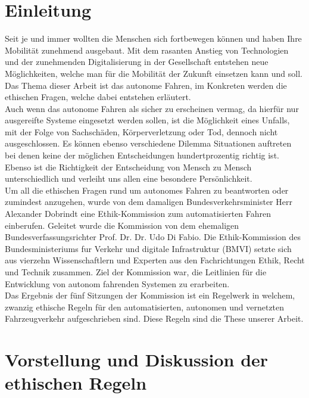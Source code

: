 \documentclass[twoside,a4paper,12pt]{article}
\begin{document}
\section{Einleitung} \label{Einleitung}
Seit je und immer wollten die Menschen sich fortbewegen können und haben Ihre Mobilität zunehmend ausgebaut. Mit dem rasanten Anstieg von Technologien und der zunehmenden Digitalisierung in der Gesellschaft entstehen neue Möglichkeiten, welche man für die Mobilität der Zukunft einsetzen kann und soll. Das Thema dieser Arbeit ist das autonome Fahren, im Konkreten werden die ethischen Fragen, welche dabei entstehen erläutert. \\ Auch wenn das autonome Fahren als sicher zu erscheinen vermag, da hierfür nur ausgereifte Systeme eingesetzt werden sollen, ist die Möglichkeit eines Unfalls, mit der Folge von Sachschäden, Körperverletzung oder Tod, dennoch nicht ausgeschlossen. Es können ebenso verschiedene Dilemma Situationen auftreten bei denen keine der möglichen Entscheidungen hundertprozentig richtig ist. Ebenso ist die Richtigkeit der Entscheidung von Mensch zu Mensch unterschiedlich und verleiht uns allen eine besondere Persönlichkeit. \\ Um all die ethischen Fragen rund um autonomes Fahren zu beantworten oder zumindest anzugehen, wurde von dem damaligen Bundesverkehrsminister Herr Alexander Dobrindt eine Ethik-Kommission zum automatisierten Fahren einberufen. Geleitet wurde die Kommission von dem ehemaligen Bundesverfassungsrichter Prof. Dr. Dr. Udo Di Fabio. Die Ethik-Kommission des Bundesministeriums fur Verkehr und digitale Infrastruktur (BMVI) setzte sich aus vierzehn Wissenschaftlern und Experten aus den Fachrichtungen Ethik, Recht und Technik zusammen. \cite{bmvi1} Ziel der Kommission war, die Leitlinien für die Entwicklung von autonom fahrenden Systemen zu erarbeiten. \\
Das Ergebnis der fünf Sitzungen der Kommission ist ein Regelwerk in welchem, zwanzig ethische Regeln für den automatisierten, autonomen
und vernetzten Fahrzeugverkehr aufgeschrieben sind. Diese Regeln sind die These unserer Arbeit. 

\newpage

\tableofcontents


\listoffigures

\newpage

\mainmatter

\cleardoublepage
\section{Vorstellung und Diskussion der ethischen Regeln} \label{VorstellungUndDiskussionDerEthischenRegeln}
\end{document}
